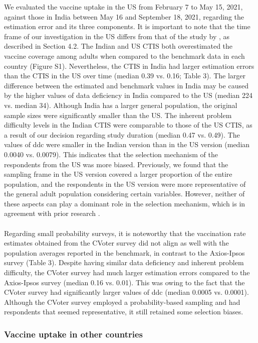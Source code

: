 \documentclass{article}
\begin{document}
We evaluated the vaccine uptake in the US from February 7 to May 15, 2021, against those in India between May 16 and September 18, 2021, regarding the estimation error and its three components. It is important to note that the time frame of our investigation in the US differs from that of the study by \cite{Bradley2021-io}, as described in Section 4.2. The Indian and US CTIS both overestimated the vaccine coverage among adults when compared to the benchmark data in each country (Figure S1). Nevertheless, the CTIS in India had larger estimation errors than the CTIS in the US over time (median 0.39 vs. 0.16; Table 3). The larger difference between the estimated and benchmark values in India may be caused by the higher values of data deficiency in India compared to the US (median 224 vs. median 34). Although India has a larger general population, the original sample sizes were significantly smaller than the US. The inherent problem difficulty levels in the Indian CTIS were comparable to those of the US CTIS, as a result of our decision regarding study duration (median 0.47 vs. 0.49). The values of ddc were smaller in the Indian version than in the US version (median 0.0040 vs. 0.0079). This indicates that the selection mechanism of the respondents from the US was more biased. Previously, we found that the sampling frame in the US version covered a larger proportion of the entire population, and the respondents in the US version were more representative of the general adult population considering certain variables. However, neither of these aspects can play a dominant role in the selection mechanism, which is in agreement with prior research \citep{Bradley2021-io}.
\\
\\
Regarding small probability surveys, it is noteworthy that the vaccination rate estimates obtained from the CVoter survey did not align as well with the population averages reported in the benchmark, in contrast to the Axios-Ipsos survey (Table 3). Despite having similar data deficiency and inherent problem difficulty, the CVoter survey had much larger estimation errors compared to the Axios-Ipsos survey (median 0.16 vs. 0.01). This was owing to the fact that the CVoter survey had significantly larger values of ddc (median 0.0005 vs. 0.0001). Although the CVoter survey employed a probability-based sampling and had respondents that seemed representative, it still retained some selection biases.

\subsubsection{Vaccine uptake in other countries}
\end{document}
